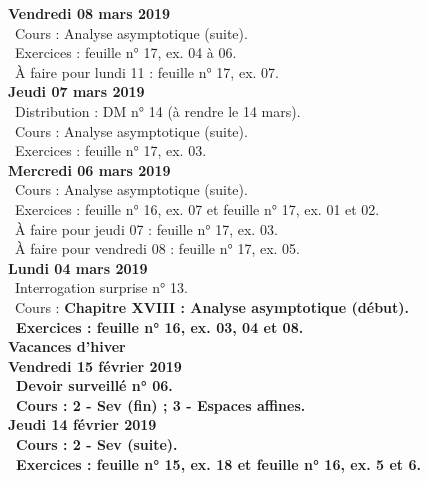 \documentclass[12pt,a4paper]{article}
\begin{document}
\noindent\textbf{\bf Vendredi 08 mars 2019} \\
\bu\ Cours : Analyse asymptotique (suite).\\
\bu\ Exercices : feuille n° 17, ex. 04 à 06.\\
\bu\ À faire pour lundi 11 : feuille n° 17, ex. 07.\vspace{.4cm}\\

\noindent\textbf{Jeudi 07 mars 2019}\\
\bu\ Distribution : DM n° 14 (à rendre le 14 mars).\\
\bu\ Cours : Analyse asymptotique (suite).\\
\bu\ Exercices : feuille n° 17, ex. 03.\vspace{.4cm}\\

\noindent\textbf{Mercredi 06 mars 2019} \\
\bu\ Cours : Analyse asymptotique (suite).\\
\bu\ Exercices : feuille n° 16, ex. 07 et feuille n° 17, ex. 01 et 02.\\
\bu\ À faire pour jeudi 07 : feuille n° 17, ex. 03.\\
\bu\ À faire pour vendredi 08 : feuille n° 17, ex. 05.\vspace{.4cm}\\

\noindent\textbf{\bf Lundi 04 mars 2019} \\
\bu\ Interrogation surprise n° 13.\\
\bu\ Cours : \bf Chapitre XVIII \rm : Analyse asymptotique 
(début).\\
\bu\ Exercices : feuille n° 16, ex. 03, 04 et 08.\vspace{.4cm}\\

\noindent\textbf{\bf Vacances d'hiver }\\

\noindent\textbf{Vendredi 15 février 2019}\\
\bu\ Devoir surveillé n° 06.\\
\bu\ Cours : 2 - Sev (fin) ; 3 - Espaces affines.\vspace{.4cm}\\
 
\noindent\textbf{Jeudi 14 février 2019}\\
\bu\ Cours : 2 - Sev (suite).\\
\bu\ Exercices : feuille n° 15, ex. 18 et feuille n° 16, ex. 5 et 6.\vspace{.4cm}\\
 
\end{document}
